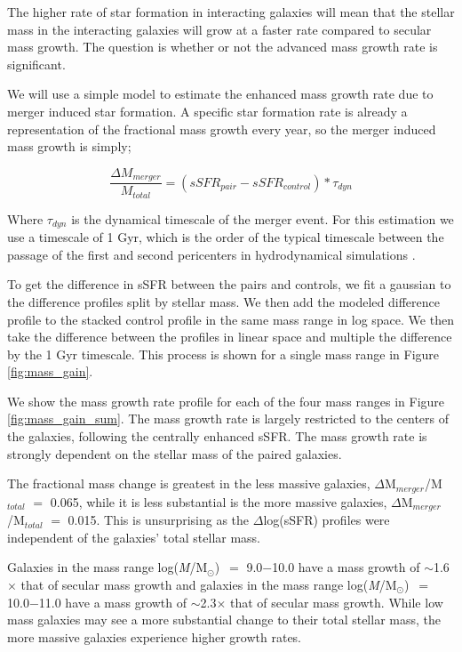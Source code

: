 \documentclass[iop,revtex4,twocolumn,apj,numberedappendix,appendixfloats]{emulateapj}
\newcommand{\logm}{log({\it M}/M$_{\odot}$)}
\begin{document}
The higher rate of star formation in interacting galaxies will mean that the stellar mass in the interacting galaxies will grow at a faster rate compared to secular mass growth. The question is whether or not the advanced mass growth rate is significant. 

We will use a simple model to estimate the enhanced mass growth rate due to merger induced star formation. A specific star formation rate is already a representation of the fractional mass growth every year, so the merger induced mass growth is simply;

\begin{equation}
\frac{\Delta M_{merger}}{M_{total}} = \left(sSFR_{pair} - sSFR_{control}\right) * \tau_{dyn}
\end{equation}

Where $\tau_{dyn}$ is the dynamical timescale of the merger event. For this estimation we use a timescale of 1 Gyr, which is the order of the typical timescale between the passage of the first and second pericenters in hydrodynamical simulations \citep{Boylan-Kolchin:2008}. 

To get the difference in sSFR between the pairs and controls, we fit a gaussian to the difference profiles split by stellar mass. We then add the modeled difference profile to the stacked control profile in the same mass range in log space. We then take the difference between the profiles in linear space and multiple the difference by the 1 Gyr timescale. This process is shown for a single mass range in Figure \ref{fig:mass_gain}.

We show the mass growth rate profile for each of the four mass ranges in Figure \ref{fig:mass_gain_sum}. The mass growth rate is largely restricted to the centers of the galaxies, following the centrally enhanced sSFR. The mass growth rate is strongly dependent on the stellar mass of the paired galaxies. 

The fractional mass change is greatest in the less massive galaxies, $\Delta$M$_{merger}$/M$_{total}$ $=$ 0.065, while it is less substantial is the more massive galaxies, $\Delta$M$_{merger}$/M$_{total}$ $=$ 0.015. This is unsurprising as the $\Delta$log(sSFR) profiles were independent of the galaxies' total stellar mass. 

Galaxies in the mass range \logm\ $=$ 9.0$-$10.0 have a mass growth of $\sim$1.6$\times$ that of secular mass growth and galaxies in the mass range \logm\ $=$ 10.0$-$11.0 have a mass growth of $\sim$2.3$\times$ that of secular mass growth. While low mass galaxies may see a more substantial change to their total stellar mass, the more massive galaxies experience higher growth rates.
\end{document}
